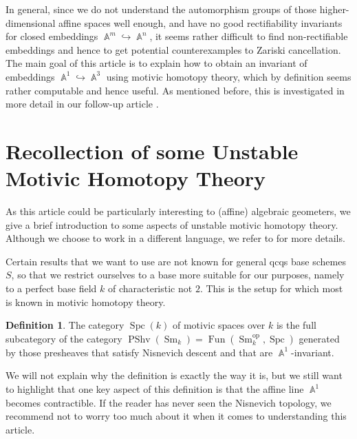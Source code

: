 \documentclass[english]{amsart}
\theoremstyle{definition}
\newtheorem{de}[prop]{Definition}
\DeclareMathOperator{\A}{\mathbb{A}}
\DeclareMathOperator{\Fun}{Fun}
\DeclareMathOperator{\op}{op}
\DeclareMathOperator{\Spc}{Spc}
\DeclareMathOperator{\Sm}{Sm}
\DeclareMathOperator{\PShv}{PShv}
\begin{document}
In general, since we do not understand the automorphism groups of those higher-dimensional affine spaces well enough, and have no good rectifiability invariants for closed embeddings $\A^m \hookrightarrow \A^n$, it seems rather difficult to find non-rectifiable embeddings and hence to get potential counterexamples to Zariski cancellation. The main goal of this article is to explain how to obtain an invariant of embeddings $\A^1 \hookrightarrow \A^3$ using motivic homotopy theory, which by definition seems rather computable and hence useful. As mentioned before, this is investigated in more detail in our follow-up article \cite{WW2}.

\section{Recollection of some Unstable Motivic Homotopy Theory}
As this article could be particularly interesting to (affine) algebraic geometers, we give a brief introduction to some aspects of unstable motivic homotopy theory. Although we choose to work in a different language, we refer to \cite{MR3727503} for more details.

\hfill

Certain results that we want to use are not known for general qcqs base schemes $S$, so that we restrict ourselves to a base more suitable for our purposes, namely to a perfect base field $k$ of characteristic not $2$. This is the setup for which most is known in motivic homotopy theory.

\begin{de}
The category $\Spc(k)$ of motivic spaces over $k$ is the full subcategory of the category $\PShv(\Sm_k) = \Fun(\Sm_k^{\op},\Spc)$ generated by those presheaves that satisfy Nisnevich descent and that are $\A^1$-invariant.
\end{de}
We will not explain why the definition is exactly the way it is, but we still want to highlight that one key aspect of this definition is that the affine line $\A^1$ becomes contractible. If the reader has never seen the Nisnevich topology, we recommend not to worry too much about it when it comes to understanding this article. 

\hfill
\end{document}
